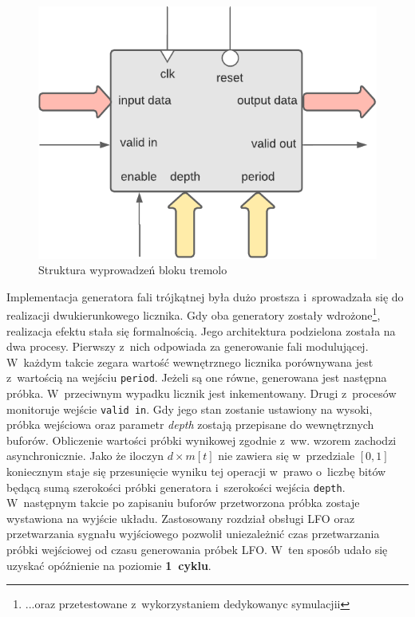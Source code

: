 \vspace{0.5cm}
\begin{figure}[ht]
    \centering
    \includegraphics[scale=0.75]{img/diagrams/tremolo.pdf}
    \captionsetup{format=plain,justification=centering}
    \caption{Struktura wyprowadzeń bloku tremolo}
    \label{tremolo-structure}
\end{figure}
\vspace{0.5cm}

Implementacja generatora fali trójkątnej była dużo prostsza i~sprowadzała się do realizacji dwukierunkowego licznika. Gdy oba generatory zostały wdrożone\footnote{...oraz przetestowane z~wykorzystaniem dedykowanyc symulacjii}, realizacja efektu stała się formalnością. Jego architektura podzielona została na dwa procesy. Pierwszy z~nich odpowiada za generowanie fali modulującej. W~każdym takcie zegara wartość wewnętrznego licznika porównywana jest z~wartością na wejściu \verb|period|. Jeżeli są one równe, generowana jest następna próbka. W~przeciwnym wypadku licznik jest inkementowany. Drugi z~procesów monitoruje wejście \verb|valid in|. Gdy jego stan zostanie ustawiony na wysoki, próbka wejściowa oraz parametr \textit{depth} zostają przepisane do wewnętrznych buforów. Obliczenie wartości próbki wynikowej zgodnie z~ww. wzorem zachodzi asynchronicznie. Jako że iloczyn $d \times m[t]$ nie zawiera się w~przedziale $[0,1]$ koniecznym staje się przesunięcie wyniku tej operacji w~prawo o~liczbę bitów będącą sumą szerokości próbki generatora i~szerokości wejścia \verb|depth|. W~następnym takcie po zapisaniu buforów przetworzona próbka zostaje wystawiona na wyjście układu. Zastosowany rozdział obsługi LFO oraz przetwarzania sygnału wyjściowego pozwolił uniezależnić czas przetwarzania próbki wejściowej od czasu generowania próbek LFO. W~ten sposób udało się uzyskać opóźnienie na poziomie \textbf{1~cyklu}.

